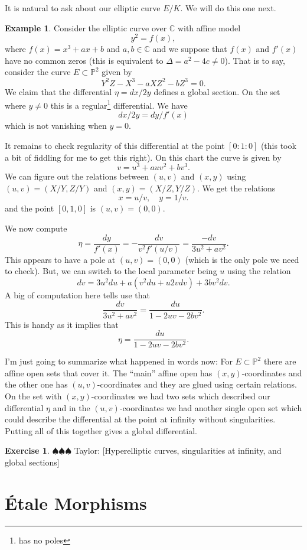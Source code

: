 \documentclass[12pt]{article}
\numberwithin{equation}{section}
\theoremstyle{definition}
\newtheorem{example}[theorem]{Example}
\newtheorem{exercise}[theorem]{Exercise}
\theoremstyle{remark}
\newcommand{\CC}{\mathbb{C}}
\newcommand{\PP}{\mathbb{P}}
\newcommand{\taylor}[1]{{\color{blue} \sf $\spadesuit\spadesuit\spadesuit$ Taylor: [#1]}}
\begin{document}
It is natural to ask about our elliptic curve $E/K$.
We will do this one next.
\begin{example}
	Consider the elliptic curve over $\CC$ with affine model
	 $$ y^2 = f(x), $$
	where $f(x)=x^3+ax+b$ and $a,b\in \CC$ and we suppose that $f(x)$ and $f'(x)$ have no common zeros (this is equivalent to $\Delta=a^2-4c\neq 0$).
	That is to say, consider the curve $E \subset \PP^2$ given by
	 $$ Y^2Z - X^3-aXZ^2-bZ^3=0. $$
	We claim that the differential $\eta=dx/2y$ defines a global section.
	On the set where $y\neq 0$ this is a regular\footnote{has no poles} differential.
	We have $$dx/2y=dy/f'(x)$$ 
	which is not vanishing when $y=0$. 
	
	It remains to check regularity of this differential at the point $[0:1:0]$ (this took a bit of fiddling for me to get this right).
	On this chart the curve is given by 
	$$v=u^3+auv^2+bv^3.$$ 
	We can figure out the relations between $(u,v)$ and $(x,y)$ using $(u,v) = (X/Y,Z/Y)$ and $(x,y)=(X/Z,Y/Z)$. 
	We get the relations
	$$ x=u/v, \quad y = 1/v.$$
	and the point  $[0,1,0]$ is $(u,v)=(0,0)$. 
	
	We now compute 
	 $$ \eta = \frac{dy}{f'(x)} = -\dfrac{dv}{v^2f'(u/v)} = \frac{-dv}{3u^2+av^2}.$$
	This appears to have a pole at $(u,v)=(0,0)$ (which is the only pole we need to check). 
	But, we can switch to the local parameter being $u$ using the relation
	 $$dv = 3u^2du+a (v^2du+ u 2vdv) + 3bv^2dv.$$
	 A big of computation here tells use that  
	 $$\dfrac{dv}{3u^2+av^2} = \dfrac{du}{1-2uv-2bv^2}.$$
	This is handy as it implies that 
	 $$ \eta = \dfrac{du}{1-2uv-2bv^2}.$$
	 
	 I'm just going to summarize what happened in words now:
	 For $E \subset \PP^2$ there are affine open sets that cover it. 
	 The ``main'' affine open has $(x,y)$-coordinates and the other one has $(u,v)$-coordinates and they are glued using certain relations. 
	 On the set with $(x,y)$-coordinates we had two sets which described our differential $\eta$ and in the $(u,v)$-coordinates we had another single open set which could describe the differential at the point at infinity without singularities.
	 Putting all of this together gives a global differential.
\end{example}


\begin{exercise}
\taylor{Hyperelliptic curves, singularities at infinity, and global sections}
\end{exercise}

\section{\'Etale Morphisms}\label{sec:etale}
\end{document}
